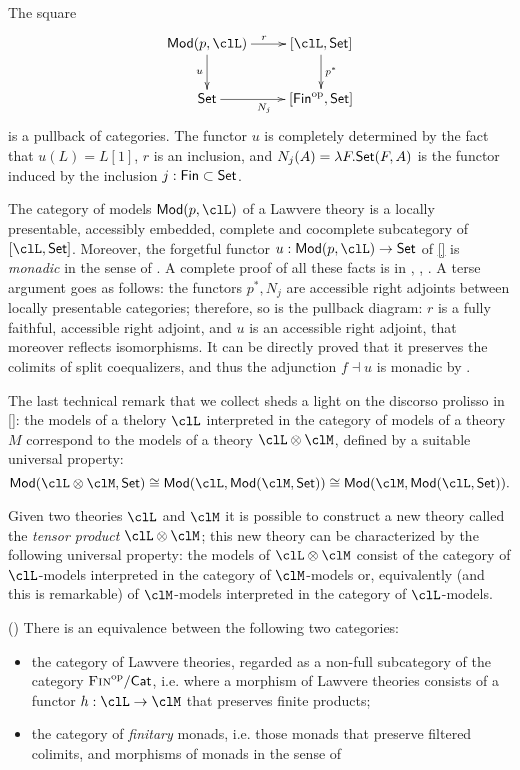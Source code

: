 \begin{corollary}
  The square 
  \[
  \xymatrix{
    \cate{Mod}(p,\clL) \ar[d]_u \ar[r]^r & [\clL,\Set]\ar[d]^{p^*} \\ 
    \Set \ar[r]_{N_j} & [\cate{Fin}^\op,\Set]
  }  
  \]
  is a pullback of categories. The functor $u$ is completely determined by the fact that $u(L) = L[1]$, $r$ is an inclusion, and $N_j(A) = \lambda F.\mathsf{Set}(F,A)$ is the functor induced by the inclusion $j : \mathsf{Fin} \subset \mathsf{Set}$.
\end{corollary}
\begin{corollary}
  The category of models $\cate{Mod}(p,\clL)$ of a Lawvere theory is a locally presentable, accessibly embedded, complete and cocomplete subcategory of $[\clL,\Set]$. Moreover, the forgetful functor $u : \cate{Mod}(p,\clL) \to \Set$ of \ref{} is \emph{monadic} in the sense of \cite[]{}. A complete proof of all these facts is in \cite[]{}, \cite[]{}, \cite[]{}. A terse argument goes as follows: the functors $p^*, N_j$ are accessible right adjoints between locally presentable categories; therefore, so is the pullback diagram: $r$ is a fully faithful, accessible right adjoint, and $u$ is an accessible right adjoint, that moreover reflects isomorphisms. It can be directly proved that it preserves the colimits of split coequalizers, and thus the adjunction $f \dashv u$ is monadic by \cite[4.4.4]{Bor2}.
\end{corollary}
The last technical remark that we collect sheds a light on the discorso prolisso in \ref{}: the models of a thelory $\clL$ interpreted in the category of models of a theory $M$ correspond to the models of a theory $\clL \otimes \clM$, defined by a suitable universal property: 
\[
\cate{Mod}(\clL\otimes \clM,\Set)  \cong
\cate{Mod}(\clL, \cate{Mod}(\clM,\Set))  \cong
\cate{Mod}(\clM, \cate{Mod}(\clL,\Set)).
\]
\begin{definition}
  Given two theories $\clL$ and $\clM$ it is possible to construct a new theory called the \emph{tensor product} $\clL \otimes \clM$; this new theory can be characterized by the following universal property: the models of $\clL \otimes \clM$ consist of the category of $\clL$-models interpreted in the category of $\clM$-models or, equivalently (and this is remarkable) of $\clM$-models interpreted in the category of $\clL$-models.
\end{definition}
\begin{theorem}
  (\cite[4.6.2]{Bor2}) There is an equivalence between the following two categories:
  \begin{itemize}
    \item the category of Lawvere theories, regarded as a non-full subcategory of the category $\textsc{Fin}^{\text{op}}/\mathsf{Cat}$, i.e. where a morphism of Lawvere theories consists of a functor $h : \clL \to \clM$ that preserves finite products;
    \item the category of \emph{finitary} monads, i.e. those monads that preserve filtered colimits, and morphisms of monads in the sense of \cite[4.5.8]{Bor2}
  \end{itemize}
\end{theorem}